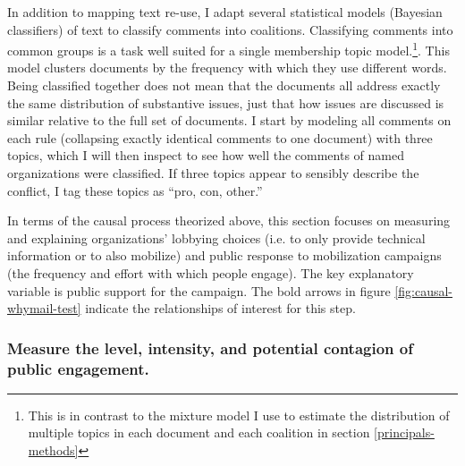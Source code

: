 
In addition to mapping text re-use, I adapt several statistical models (Bayesian classifiers) of text to classify comments into coalitions. Classifying comments into common groups is a task well suited for a single membership topic model.\footnote{
This is in contrast to the mixture model I use to estimate the distribution of multiple topics in each document and each coalition in section \ref{principals-methods}
}. 
This model clusters documents by the frequency with which they use different words. Being classified together does not mean that the documents all address exactly the same distribution of substantive issues, just that how issues are discussed is similar relative to the full set of documents.
I start by modeling all comments on each rule (collapsing exactly identical comments to one document) with three topics, which I will then inspect to see how well the comments of named organizations were classified. If three topics appear to sensibly describe the conflict, I tag these topics as ``pro, con, other.'' 





In terms of the causal process theorized above, this section focuses on measuring and explaining organizations' lobbying choices (i.e. to only provide technical information or to also mobilize) and public response to mobilization campaigns (the frequency and effort with which people engage). The key explanatory variable is public support for the campaign. The bold arrows in figure \ref{fig:causal-whymail-test} indicate the relationships of interest for this step.







\subsubsection{Measure the level, intensity, and potential contagion of public engagement.}


